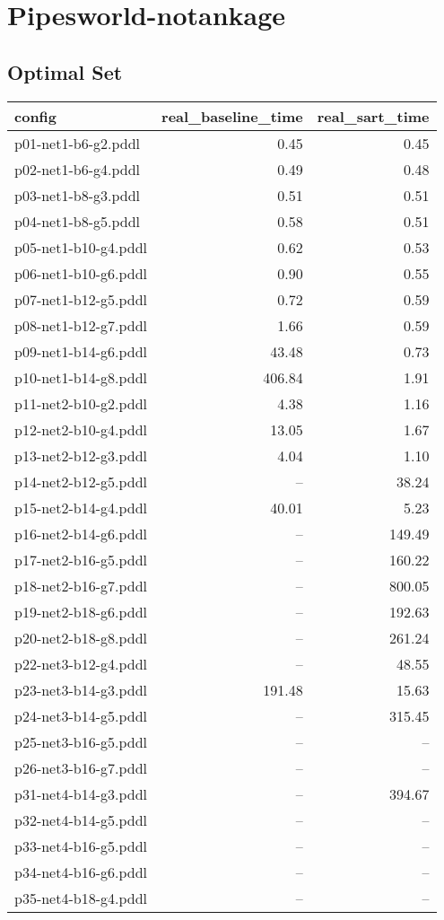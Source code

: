 \documentclass{article}
\begin{document}
                \newpage \section{Pipesworld-notankage}
                    \subsection*{Optimal Set}
                    
                            \begin{center}
                            \scriptsize
                            \begin{tabular}{@{}l|r|r@{}}
                            config & real\_baseline\_time & real\_sart\_time\\\midrule
                             p01-net1-b6-g2.pddl&0.45&0.45\\
 p02-net1-b6-g4.pddl&0.49&0.48\\
 p03-net1-b8-g3.pddl&0.51&0.51\\
 p04-net1-b8-g5.pddl&0.58&0.51\\
 p05-net1-b10-g4.pddl&0.62&0.53\\
 p06-net1-b10-g6.pddl&0.90&0.55\\
 p07-net1-b12-g5.pddl&0.72&0.59\\
 p08-net1-b12-g7.pddl&1.66&0.59\\
 p09-net1-b14-g6.pddl&43.48&0.73\\
 p10-net1-b14-g8.pddl&406.84&1.91\\
 p11-net2-b10-g2.pddl&4.38&1.16\\
 p12-net2-b10-g4.pddl&13.05&1.67\\
 p13-net2-b12-g3.pddl&4.04&1.10\\
 p14-net2-b12-g5.pddl&--&38.24\\
 p15-net2-b14-g4.pddl&40.01&5.23\\
 p16-net2-b14-g6.pddl&--&149.49\\
 p17-net2-b16-g5.pddl&--&160.22\\
 p18-net2-b16-g7.pddl&--&800.05\\
 p19-net2-b18-g6.pddl&--&192.63\\
 p20-net2-b18-g8.pddl&--&261.24\\
 p22-net3-b12-g4.pddl&--&48.55\\
 p23-net3-b14-g3.pddl&191.48&15.63\\
 p24-net3-b14-g5.pddl&--&315.45\\
 p25-net3-b16-g5.pddl&--&--\\
 p26-net3-b16-g7.pddl&--&--\\
 p31-net4-b14-g3.pddl&--&394.67\\
 p32-net4-b14-g5.pddl&--&--\\
 p33-net4-b16-g5.pddl&--&--\\
 p34-net4-b16-g6.pddl&--&--\\
 p35-net4-b18-g4.pddl&--&--
                            \end{tabular}
                            \end{center}
                    
\end{document}
